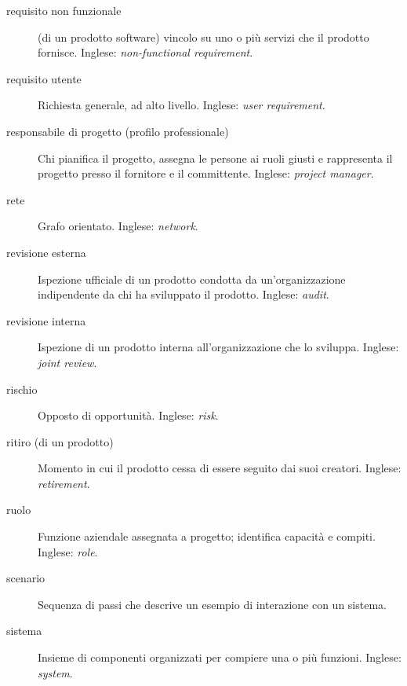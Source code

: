 \documentclass[a4paper]{article}
\begin{document}
\begin{description}
	\item[requisito non funzionale] 

			(di un prodotto software) vincolo su uno o più servizi che il prodotto fornisce. Inglese: \emph{non-functional requirement}.
			
	\item[requisito utente] 

			Richiesta generale, ad alto livello. Inglese: \emph{user requirement}.
			
	\item[responsabile di progetto (profilo professionale)] 

			Chi pianifica il progetto, assegna le persone ai ruoli giusti e rappresenta il progetto presso il fornitore e il committente. Inglese: \emph{project manager}.
			
	\item[rete] 

			Grafo orientato. Inglese: \emph{network}.
			
	\item[revisione esterna] 

			Ispezione ufficiale di un prodotto condotta da un'organizzazione indipendente da chi ha sviluppato il prodotto. Inglese: \emph{audit}.
			
	\item[revisione interna] 

			Ispezione di un prodotto interna all'organizzazione che lo sviluppa. Inglese: \emph{joint review}.
			
	\item[rischio] 

			Opposto di opportunità. Inglese: \emph{risk}.
			
	\item[ritiro (di un prodotto)] 

			Momento in cui il prodotto cessa di essere seguito dai suoi creatori. Inglese: \emph{retirement}.
			
	\item[ruolo] 

			Funzione aziendale assegnata a progetto; identifica capacità e compiti. Inglese: \emph{role}.
			
	\item[scenario] 

			Sequenza di passi che descrive un esempio di interazione con un sistema.
			
	\item[sistema] 

			Insieme di componenti organizzati per compiere una o più funzioni. Inglese: \emph{system}.
			

\end{description}
\end{document}
